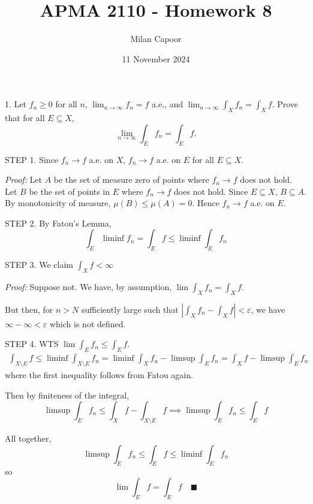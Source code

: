 \documentclass[12pt]{article}
\title{APMA 2110 - Homework 8}
\author{Milan Capoor}
\date{11 November 2024}
\newcommand{\qed}{\quad \blacksquare}
\newcommand{\abs}[1]{\left\vert #1 \right\vert}
\newcommand{\ep}{\varepsilon}
\newcommand{\sub}{\subseteq}
\newenvironment*{proof}[1][blue]{
\begin{tcolorbox}[
    parbox=false,
    colback=#1!5!white,
    colframe=#1!75!black,
    breakable
]}
{\end{tcolorbox}}
\begin{document}
\maketitle

1. Let $f_n \geq 0$ for all $n$, $\lim_{n \to \infty} f_n = f$ a.e., and $\lim_{n \to \infty} \int_X f_n = \int_X f$. Prove that for all $E \sub X$, 
\[\lim_{n \to \infty} \int_E f_n = \int_E f.\]

    \color{blue}
        STEP 1. Since $f_n \to f$ a.e. on $X$, $f_n \to f$ a.e. on $E$ for all $E \sub X$.

        \begin{proof}
            \emph{Proof:} Let $A$ be the set of measure zero of points where $f_n \to f$ does not hold. Let $B$ be the set of points in $E$ where $f_n \to f$ does not hold. Since $E \sub X$, $B \sub A$. By monotonicity  of measure, $\mu(B) \leq \mu(A) = 0$. Hence $f_n \to f$ a.e. on $E$.
        \end{proof}

        STEP 2. By Fatou's Lemma,
        \[\int_E \liminf f_n = \int_E f \leq \liminf \int_E f_n\]
        
        STEP 3. We claim $\int_X f < \infty$

        \begin{proof}
            \emph{Proof:} Suppose not. We have, by assumption, $\lim \int_X f_n = \int_X f$.

            But then, for $n > N$ sufficiently large such that $\abs{\int_X f_n - \int_X f} < \ep$,  we have $\infty - \infty < \ep$ which is not defined. 
        \end{proof}

        STEP 4. WTS $\lim \int_E f_n \leq \int_E f$.
        \begin{align*}
            \int_{X \setminus E} f \leq \liminf \int_{X \setminus E} f_n
                = \liminf \int_X f_n - \limsup \int_E f_n
                = \int_X f - \limsup \int_E f_n
        \end{align*}
        where the first inequality follows from Fatou again. 
        
        Then by finiteness of the integral,
        \[\limsup \int_E f_n \leq \int_X f - \int_{X \setminus E} f \implies \limsup \int_E f_n \leq \int_E f\]

        All together, 
        \[\limsup \int_E f_n \leq \int_E f \leq \liminf \int_E f_n\]
        so 
        \[\lim \int_E f = \int_E f \qed\]
    \color{black}
\end{document}
